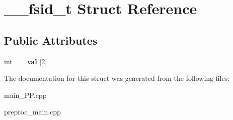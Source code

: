 \hypertarget{struct____fsid__t}{\section{\+\_\+\+\_\+fsid\+\_\+t Struct Reference}
\label{struct____fsid__t}
}
\subsection*{Public Attributes}
\begin{DoxyCompactItemize}
\item 
\hypertarget{struct____fsid__t_adbefed1af3f4b9a441cd8c2a82088b05}{int {\bfseries \+\_\+\+\_\+val} \mbox{[}2\mbox{]}}\label{struct____fsid__t_adbefed1af3f4b9a441cd8c2a82088b05}

\end{DoxyCompactItemize}


The documentation for this struct was generated from the following files\+:\begin{DoxyCompactItemize}
\item 
main\+\_\+\+P\+P.\+cpp\item 
preproc\+\_\+main.\+cpp\end{DoxyCompactItemize}
